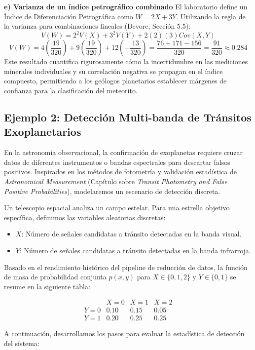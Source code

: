 \textbf{e) Varianza de un índice petrográfico combinado}
El laboratorio define un Índice de Diferenciación Petrográfica como $W = 2X + 3Y$. Utilizando la regla de la varianza para combinaciones lineales (Devore, Sección 5.5):
$$ V(W) = 2^2 V(X) + 3^2 V(Y) + 2(2)(3) Cov(X,Y) $$
$$ V(W) = 4\left(\frac{19}{320}\right) + 9\left(\frac{19}{320}\right) + 12\left(-\frac{13}{320}\right) = \frac{76 + 171 - 156}{320} = \frac{91}{320} \approx 0.284 $$
Este resultado cuantifica rigurosamente cómo la incertidumbre en las mediciones minerales individuales y su correlación negativa se propagan en el índice compuesto, permitiendo a los geólogos planetarios establecer márgenes de confianza para la clasificación del meteorito.

\subsection{Ejemplo 2: Detección Multi-banda de Tránsitos Exoplanetarios}

En la astronomía observacional, la confirmación de exoplanetas requiere cruzar datos de diferentes instrumentos o bandas espectrales para descartar falsos positivos. Inspirados en los métodos de fotometría y validación estadística de \textit{Astronomical Measurement} (Capítulo sobre \textit{Transit Photometry and False Positive Probabilities}), modelaremos un escenario de detección discreta.

Un telescopio espacial analiza un campo estelar. Para una estrella objetivo específica, definimos las variables aleatorias discretas:
\begin{itemize}
    \item $X$: Número de señales candidatas a tránsito detectadas en la banda visual.
    \item $Y$: Número de señales candidatas a tránsito detectadas en la banda infrarroja.
\end{itemize}

Basado en el rendimiento histórico del pipeline de reducción de datos, la función de masa de probabilidad conjunta $p(x,y)$ para $X \in \{0, 1, 2\}$ y $Y \in \{0, 1\}$ se resume en la siguiente tabla:

$$
\begin{array}{c|ccc}
 & X=0 & X=1 & X=2 \\
\hline
Y=0 & 0.10 & 0.15 & 0.05 \\
Y=1 & 0.20 & 0.25 & 0.25
\end{array}
$$

A continuación, desarrollamos los pasos para evaluar la estadística de detección del sistema:

